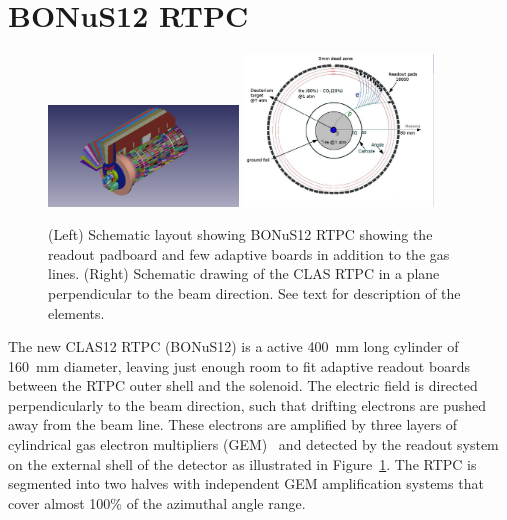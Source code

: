 \section{BONuS12 RTPC} 

\begin{figure}
  \begin{center}
    \includegraphics[angle=0, width=0.45\textwidth, clip,trim=50mm 10mm 80mm 
     0mm]{figures/Bonus12_cad.png}
    \includegraphics[angle=0, width=0.45\textwidth,clip,trim=0mm 10mm 20mm 0mm 
     ]{figures/NKsBXp.png}
     \caption{(Left) Schematic layout showing BONuS12 RTPC showing the readout 
     padboard and few adaptive boards in addition to the gas lines. (Right) 
     Schematic drawing of the CLAS RTPC in a plane perpendicular to the beam 
     direction. See text for description of the elements.}
    \label{fig:bonus12}
  \end{center}
\end{figure}

The new CLAS12 RTPC (BONuS12) is a active 400~mm long cylinder of 160~mm 
diameter, leaving just enough room to fit adaptive readout boards between the 
RTPC outer shell and the solenoid. The electric field is directed 
perpendicularly to the beam direction, such that drifting electrons are pushed 
away from the beam line. These electrons are amplified by three layers of 
cylindrical gas electron multipliers (GEM)~\cite{Sauli:2016eeu} and detected by 
the readout system on the external shell of the detector as illustrated in 
Figure~\ref{fig:bonus12}.  The RTPC is segmented into two halves with 
independent GEM amplification systems that cover almost 100\% of the azimuthal 
angle range.

